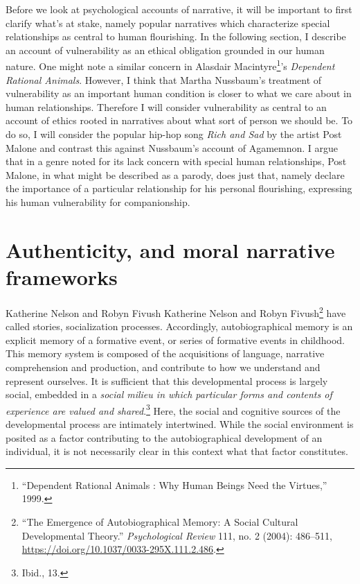 \documentclass[phdthesis,12pt,final]{wuthesis}
\theoremstyle{definition}
\theoremstyle{definition}
\theoremstyle{definition}
\theoremstyle{definition}
\theoremstyle{remark}
\begin{document}
Before we look at psychological accounts of narrative, it will be important to first clarify what's at stake, namely popular narratives which characterize special relationships as central to human flourishing. In the following section, I describe an account of vulnerability as an ethical obligation grounded in our human nature. One might note a similar concern in Alasdair Macintyre\footnote{{``Dependent Rational Animals : Why Human Beings Need the Virtues,''} 1999.}'s \emph{Dependent Rational Animals}. However, I think that Martha Nussbaum's treatment of vulnerability as an important human condition is closer to what we care about in human relationships. Therefore I will consider vulnerability as central to an account of ethics rooted in narratives about what sort of person we should be. To do so, I will consider the popular hip-hop song \emph{Rich and Sad} by the artist Post Malone and contrast this against Nussbaum's account of Agamemnon. I argue that in a genre noted for its lack concern with special human relationships, Post Malone, in what might be described as a parody, does just that, namely declare the importance of a particular relationship for his personal flourishing, expressing his human vulnerability for companionship.

\section{Authenticity, and moral narrative frameworks}\label{authenticity-and-moral-narrative-frameworks}

Katherine Nelson and Robyn Fivush Katherine Nelson and Robyn Fivush\footnote{{``The {Emergence} of {Autobiographical Memory}: {A Social Cultural Developmental Theory}.''} \emph{Psychological Review} 111, no. 2 (2004): 486--511, \url{https://doi.org/10.1037/0033-295X.111.2.486}.} have called stories, socialization processes. Accordingly, autobiographical memory is an explicit memory of a formative event, or series of formative events in childhood. This memory system is composed of the acquisitions of language, narrative comprehension and production, and contribute to how we understand and represent ourselves. It is sufficient that this developmental process is largely social, embedded in a \emph{social milieu in which particular forms and contents of experience are valued and shared}.\footnote{Ibid., 13.} Here, the social and cognitive sources of the developmental process are intimately intertwined. While the social environment is posited as a factor contributing to the autobiographical development of an individual, it is not necessarily clear in this context what that factor constitutes.
\end{document}
